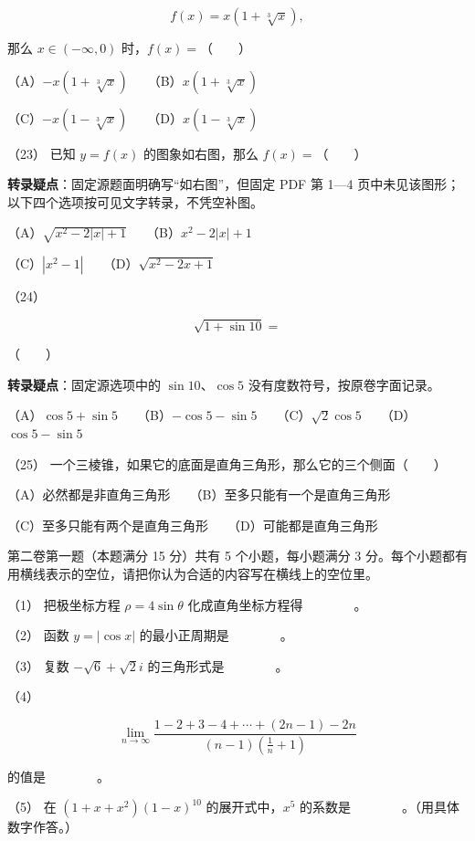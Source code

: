 \begin{question}
\nopagebreak[4]
\[
f(x)=x(1+\sqrt[3]{x}),
\]

那么 $x\in(-\infty,0)$ 时，$f(x)=$\mbox{（　　）}

（A）$-x(1+\sqrt[3]{x})$　　（B）$x(1+\sqrt[3]{x})$

（C）$-x(1-\sqrt[3]{x})$　　（D）$x(1-\sqrt[3]{x})$

（23） 已知 $y=f(x)$ 的图象如右图，那么 $f(x)=$\mbox{（　　）}

\begin{gktip}
\textbf{转录疑点}：固定源题面明确写“如右图”，但固定 PDF 第 1—4 页中未见该图形；以下四个选项按可见文字转录，不凭空补图。
\end{gktip}

（A）$\sqrt{x^2-2|x|+1}$　　（B）$x^2-2|x|+1$

（C）$|x^2-1|$　　（D）$\sqrt{x^2-2x+1}$

（24）　

\nopagebreak[4]
\[
\sqrt{1+\sin10}=
\]

\mbox{（　　）}

\begin{gktip}
\textbf{转录疑点}：固定源选项中的 $\sin10$、$\cos5$ 没有度数符号，按原卷字面记录。
\end{gktip}

（A）$\cos5+\sin5$　　（B）$-\cos5-\sin5$　　（C）$\sqrt2\cos5$　　（D）$\cos5-\sin5$

（25） 一个三棱锥，如果它的底面是直角三角形，那么它的三个侧面\mbox{（　　）}

（A）必然都是非直角三角形　　（B）至多只能有一个是直角三角形

（C）至多只能有两个是直角三角形　　（D）可能都是直角三角形

\end{question}
\begin{question}

第二卷第一题（本题满分 15 分）共有 5 个小题，每小题满分 3 分。每个小题都有用横线表示的空位，请把你认为合适的内容写在横线上的空位里。

（1） 把极坐标方程 $\rho=4\sin\theta$ 化成直角坐标方程得　　　　。

（2） 函数 $y=|\cos x|$ 的最小正周期是　　　　。

（3） 复数 $-\sqrt6+\sqrt2i$ 的三角形式是　　　　。

（4）　

\nopagebreak[4]
\[
\lim_{n\to\infty}
\frac{1-2+3-4+\cdots+(2n-1)-2n}{(n-1)\left(\frac1n+1\right)}
\]

的值是　　　　。

（5） 在 $(1+x+x^2)(1-x)^{10}$ 的展开式中，$x^5$ 的系数是　　　　。（用具体数字作答。）

\Needspace{0.4\textheight}
\end{question}
